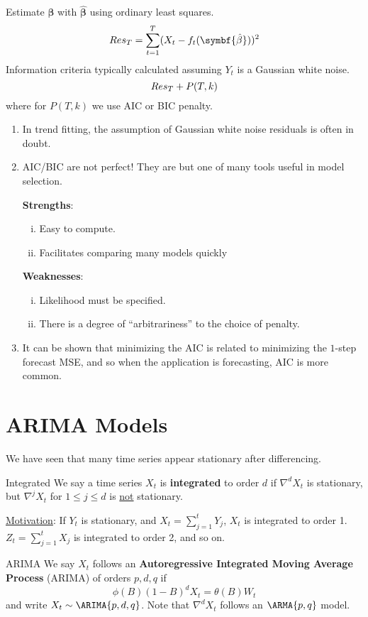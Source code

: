 Estimate $ \symbf{\beta} $ with $ \hat{\symbf{\beta}} $ using ordinary least squares.
\[ \SS{Res}_T=\sum_{t=1}^{T}(X_t-f_t(\symbf{\hat{\beta}}))^2 \]
Information criteria typically calculated assuming $ Y_t $ is a Gaussian white noise.
\[ \relax{Res}_T+P(T,k) \]
where for $ P(T,k) $ we use AIC or BIC penalty.
\begin{Remark}{}{}
    \begin{enumerate}[(1)]
        \item In trend fitting, the assumption of Gaussian white noise residuals is often in doubt.
        \item AIC/BIC are not perfect! They are but one of many tools useful in model selection.

              \textbf{Strengths}:
              \begin{enumerate}[(i)]
                  \item Easy to compute.
                  \item Facilitates comparing many models quickly
              \end{enumerate}
              \textbf{Weaknesses}:
              \begin{enumerate}[(i)]
                  \item Likelihood must be specified.
                  \item There is a degree of ``arbitrariness'' to the choice of penalty.
              \end{enumerate}
        \item It can be shown that minimizing the AIC is related to minimizing
              the $ 1 $-step forecast MSE, and so when the application is forecasting,
              AIC is more common.
    \end{enumerate}
\end{Remark}
\section{ARIMA Models}
We have seen that many time series appear stationary after differencing.
\begin{Definition}{Integrated}{}
    We say a time series $ X_t $ is \textbf{integrated} to order $ d $
    if $ \nabla^d X_t $ is stationary, but $ \nabla^j X_t $
    for $ 1\le j\le d $ is \underline{not} stationary.
\end{Definition}
\underline{Motivation}: If $ Y_t $ is stationary,
and $ X_t=\sum_{j=1}^{t} Y_j $, $ X_t $ is integrated to order 1.
$ Z_t=\sum_{j=1}^{t} X_j $ is integrated to order 2, and so on.
\begin{Definition}{ARIMA}{}
    We say $ X_t $ follows an \textbf{Autoregressive Integrated Moving Average Process}
    (ARIMA) of orders $ p,d,q $ if
    \[ \phi(B)(1-B)^d X_t=\theta(B)W_t \]
    and write $ X_t \sim \ARIMA{p,d,q} $. Note that $ \nabla^d X_t $
    follows an $ \ARMA{p,q} $ model.
\end{Definition}
